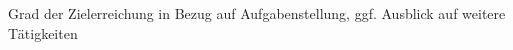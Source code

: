\documentclass[crop=false]{standalone}
\begin{document}
Grad der Zielerreichung in Bezug auf Aufgabenstellung, ggf. Ausblick auf weitere Tätigkeiten
\end{document}
